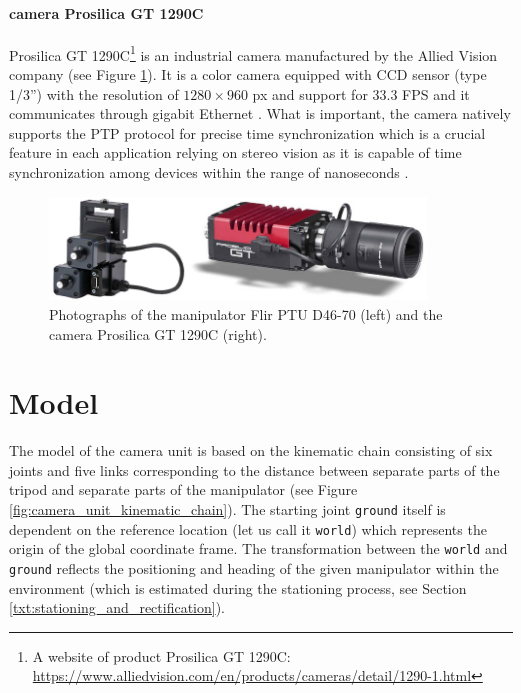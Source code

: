 \paragraph{camera Prosilica GT 1290C} Prosilica GT 1290C\footnote{A website of product Prosilica GT 1290C: \url{https://www.alliedvision.com/en/products/cameras/detail/1290-1.html}} is an industrial camera manufactured by the Allied Vision company (see Figure \ref{fig:prosilica_gt1290c_flir_ptud4670}). It is a color camera equipped with CCD sensor (type 1/3'') with the resolution of $1280 \times 960$ px and support for $33.3$ FPS and it communicates through gigabit Ethernet \cite{Prosilica_gt1290c}. What is important, the camera natively supports the PTP protocol for precise time synchronization which is a crucial feature in each application relying on stereo vision as it is capable of time synchronization among devices within the range of nanoseconds \cite{PTP}.

\begin{figure}[htb]
	\centering
	\includegraphics[width=10cm]{fig/prosilica_gt1290c_flir_ptud4670.jpg}
	\caption{Photographs of the manipulator Flir PTU D46-70 (left) and the camera Prosilica GT 1290C (right).}
	\label{fig:prosilica_gt1290c_flir_ptud4670}
\end{figure}

\section{Model} \label{txt:model}

The model of the camera unit is based on the kinematic chain consisting of six joints and five links corresponding to the distance between separate parts of the tripod and separate parts of the manipulator (see Figure \ref{fig:camera_unit_kinematic_chain}). The starting joint \texttt{ground} itself is dependent on the reference location (let us call it \texttt{world}) which represents the origin of the global coordinate frame. The transformation between the \texttt{world} and \texttt{ground} reflects the positioning and heading of the given manipulator within the environment (which is estimated during the stationing process, see Section \ref{txt:stationing_and_rectification}).


